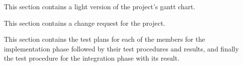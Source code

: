 \label{sec:gantt}
This section contains a light version of the project's gantt chart.


\label{sec:change}
This section contains a change request for the project.



\label{sec:tests}

This section contains the test plans for each of the members for the implementation phase followed by their test procedures and results, and finally the test procedure for the integration phase with its result.









